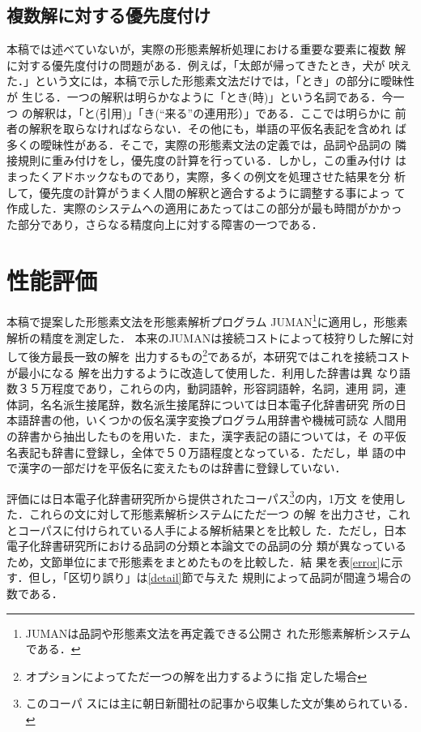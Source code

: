 \subsection{複数解に対する優先度付け}
本稿では述べていないが，実際の形態素解析処理における重要な要素に複数
解に対する優先度付けの問題がある．例えば，「太郎が帰ってきたとき，犬が
吠えた．」という文には，本稿で示した形態素文法だけでは，「とき」の部分に曖昧性が
生じる．一つの解釈は明らかなように「とき(時)」という名詞である．今一つ
の解釈は，「と(引用)」「き(``来る''の連用形）」である．ここでは明らかに
前者の解釈を取らなければならない．その他にも，単語の平仮名表記を含めれ
ば多くの曖昧性がある．そこで，実際の形態素文法の定義では，品詞や品詞の
隣接規則に重み付けをし，優先度の計算を行っている．しかし，この重み付け
はまったくアドホックなものであり，実際，多くの例文を処理させた結果を分
析して，優先度の計算がうまく人間の解釈と適合するように調整する事によっ
て作成した．実際のシステムへの適用にあたってはこの部分が最も時間がかかっ
た部分であり，さらなる精度向上に対する障害の一つである．

\section{性能評価}\label{eval2}
本稿で提案した形態素文法を形態素解析プログラム
JUMAN\cite{juman}\footnote{JUMANは品詞や形態素文法を再定義できる公開さ
れた形態素解析システムである．}に適用し，形態素解析の精度を測定した．
本来のJUMANは接続コストによって枝狩りした解に対して後方最長一致の解を
出力するもの\footnote{オプションによってただ一つの解を出力するように指
定した場合}であるが，本研究ではこれを接続コストが最小になる
解\cite{hisamitu90}を出力するように改造して使用した．利用した辞書は異
なり語数３５万程度であり，これらの内，動詞語幹，形容詞語幹，名詞，連用
詞，連体詞，名名派生接尾辞，数名派生接尾辞については日本電子化辞書研究
所の日本語辞書の他，いくつかの仮名漢字変換プログラム用辞書や機械可読な
人間用の辞書から抽出したものを用いた．また，漢字表記の語については，そ
の平仮名表記も辞書に登録し，全体で５０万語程度となっている．ただし，単
語の中で漢字の一部だけを平仮名に変えたものは辞書に登録していない．

評価には日本電子化辞書研究所から提供されたコーパス\footnote{このコーパ
スには主に朝日新聞社の記事から収集した文が集められている．}の内，1万文
を使用した．これらの文に対して形態素解析システムに{\dg ただ一つ} の解
を出力させ，これとコーパスに付けられている人手による解析結果とを比較し
た．ただし，日本電子化辞書研究所における品詞の分類と本論文での品詞の分
類が異なっているため，文節単位にまで形態素をまとめたものを比較した．結
果を表\ref{error}に示す．但し，「区切り誤り」は\ref{detail}節で与えた
規則によって品詞が間違う場合の数である．

